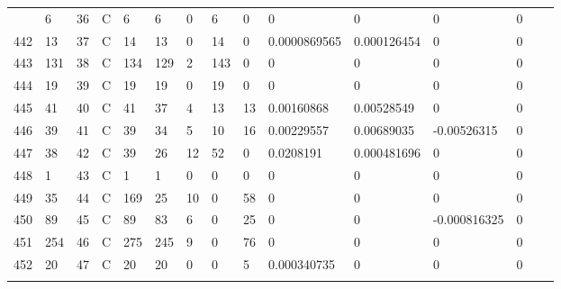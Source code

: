 \begin{longtable}{lllllllllllllll}
\begin{comment}
	441 & 6                 & 36  & C   & 6                 & 6                 & 0                 & 6    & 0          & 0              & 0              & 0             & 0            \\
	442 & 13                & 37  & C   & 14                & 13                & 0                 & 14   & 0          & 0.0000869565   & 0.000126454    & 0             & 0            \\
	443 & 131               & 38  & C   & 134               & 129               & 2                 & 143  & 0          & 0              & 0              & 0             & 0            \\
	444 & 19                & 39  & C   & 19                & 19                & 0                 & 19   & 0          & 0              & 0              & 0             & 0            \\
	445 & 41                & 40  & C   & 41                & 37                & 4                 & 13   & 13         & 0.00160868     & 0.00528549     & 0             & 0            \\
	446 & 39                & 41  & C   & 39                & 34                & 5                 & 10   & 16         & 0.00229557     & 0.00689035     & -0.00526315   & 0            \\
	447 & 38                & 42  & C   & 39                & 26                & 12                & 52   & 0          & 0.0208191      & 0.000481696    & 0             & 0            \\
	448 & 1                 & 43  & C   & 1                 & 1                 & 0                 & 0    & 0          & 0              & 0              & 0             & 0            \\
	449 & 35                & 44  & C   & 169               & 25                & 10                & 0    & 58         & 0              & 0              & 0             & 0            \\
	450 & 89                & 45  & C   & 89                & 83                & 6                 & 0    & 25         & 0              & 0              & -0.000816325  & 0            \\
	451 & 254               & 46  & C   & 275               & 245               & 9                 & 0    & 76         & 0              & 0              & 0             & 0            \\
	452 & 20                & 47  & C   & 20                & 20                & 0                 & 0    & 5          & 0.000340735    & 0              & 0             & 0            \\

\end{comment}
\end{longtable}
